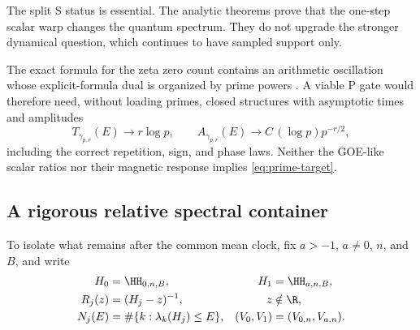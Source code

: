The split S status is essential.  The analytic theorems prove that the
one-step scalar warp changes the quantum spectrum.  They do not upgrade the
stronger dynamical question, which continues to have sampled support only.

The exact formula for the zeta zero count contains an arithmetic oscillation
whose explicit-formula dual is organized by prime powers
\citep{Riemann1859,TitchmarshHeathBrown1986}.  A viable P gate would therefore
need, without loading primes, closed structures with asymptotic times and
amplitudes
\begin{equation}
 T_{\gamma_{p,r}}(E)\longrightarrow r\log p,\qquad
 A_{\gamma_{p,r}}(E)\longrightarrow
 C\,(\log p)p^{-r/2},
 \label{eq:prime-target}
\end{equation}
including the correct repetition, sign, and phase laws.  Neither the GOE-like
scalar ratios nor their magnetic response implies \cref{eq:prime-target}.

\subsection{A rigorous relative spectral container}
\label{sec:relative-container}

To isolate what remains after the common mean clock, fix
\(a>-1\), \(a\neq0\), \(n\), and \(B\), and write
\begin{equation}
 \begin{aligned}
 H_0&=\HH_{0,n,B},& H_1&=\HH_{a,n,B},\\
 R_j(z)&=(H_j-z)^{-1},& z&\notin\R,\\
 N_j(E)&=\#\{k:\lambda_k(H_j)\leq E\},&
 (V_0,V_1)&=(V_{0,n},V_{a,n}).
 \end{aligned}
 \label{eq:relative-pair}
\end{equation}

